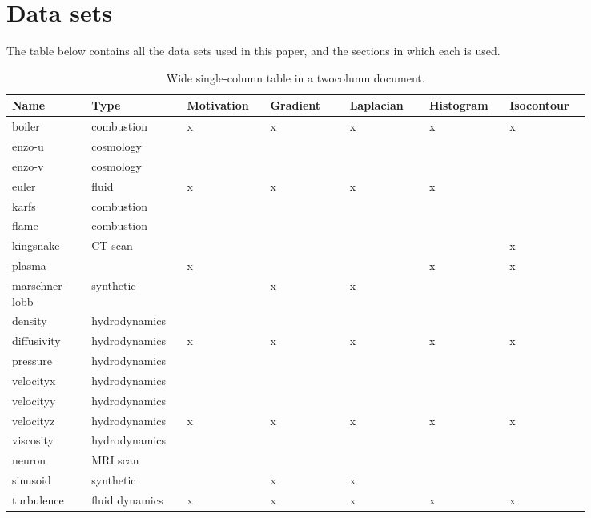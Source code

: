 \section{Data sets}

The table below contains all the data sets used in this paper, and the sections in which each is used.

\begin{table*}[ht]
  \caption{Wide single-column table in a twocolumn document.}
  \centering
  \begin{tabular}{p{0.12\linewidth}p{0.12\linewidth}p{0.12\linewidth}p{0.12\linewidth}p{0.12\linewidth}p{0.12\linewidth}p{0.12\linewidth}}
  \hline
  Name & Type & Motivation & Gradient & Laplacian & Histogram & Isocontour\\
  \hline
  boiler & combustion & x & x & x & x & x \\
  enzo-u & cosmology & & & & & \\
  enzo-v & cosmology & & & & & \\
  euler & fluid & x & x & x & x & \\
  karfs & combustion & & & & & \\
  flame & combustion & & & & & \\
  kingsnake & CT scan & & & & & x \\
  plasma &  & x & & & x & x \\
  marschner-lobb & synthetic & & x & x & & \\
  density & hydrodynamics & & & & & \\
  diffusivity & hydrodynamics & x & x & x & x & x \\
  pressure & hydrodynamics & & & & & \\
  velocityx & hydrodynamics & & & & & \\
  velocityy & hydrodynamics & & & & & \\
  velocityz & hydrodynamics & x & x & x & x & x \\
  viscosity & hydrodynamics & & & & & \\
  neuron & MRI scan & & & & & \\
  sinusoid & synthetic & & x & x & & \\
  turbulence & fluid dynamics & x & x & x & x & x \\
  \hline
  \end{tabular}
\end{table*}
